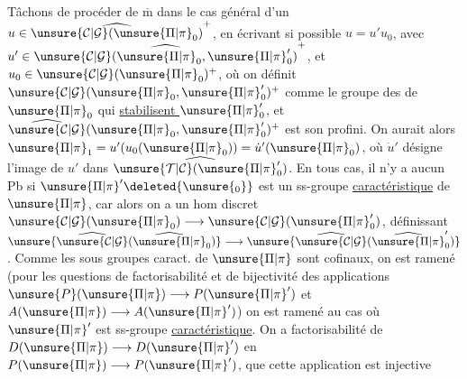 Tâchons de procéder de $\overline{\mathrm m}$ dans le cas général d'un $u\in\widehat{\unsure{\mathcal{C}|\mathcal{G}}(\unsure{\Pi|\pi}_0)}^+$,  en écrivant si possible $u=u'u_0$, avec $u'\in\widehat{\unsure{\mathcal{C}|\mathcal{G}}(\unsure{\Pi|\pi}_0,\unsure{\Pi|\pi}'_0)}^+$, et $u_0\in\unsure{\mathcal{C}|\mathcal{G}}(\unsure{\Pi|\pi}_0)^+$, où on définit $\unsure{\mathcal{C}|\mathcal{G}}(\unsure{\Pi|\pi}_0,\unsure{\Pi|\pi}'_0)^+$ comme le groupe des   de $\unsure{\Pi|\pi}_0$ qui \uline{stabilisent $\unsure{\Pi|\pi}'_0$}, et $\widehat{\unsure{\mathcal{C}|\mathcal{G}}}(\unsure{\Pi|\pi}_0,\unsure{\Pi|\pi}'_0)^+$ est son  profini. On aurait alors $\unsure{\Pi|\pi}_1=u'(u_0(\unsure{\Pi|\pi}_0))=\dot{u}'(\unsure{\Pi|\pi}_0)$, où  $\dot{u}'$ désigne l'image de $u'$ dans $\widehat{\unsure{\mathcal{T}|\mathcal{C}}(\unsure{\Pi|\pi}'_0)}$. En tous cas, il n'y a aucun Pb si $\unsure{\Pi|\pi}'\deleted{\unsure{_0}}$ est un ss-groupe  \uline{caractéristique} de $\unsure{\Pi|\pi}$, car alors on a un hom
discret $\unsure{\mathcal{C}|\mathcal{G}}(\unsure{\Pi|\pi}_0)\longrightarrow\unsure{\mathcal{C}|\mathcal{G}}(\unsure{\Pi|\pi}'_0)$, définissant  $\unsure{\widehat{\unsure{\mathcal{C}|\mathcal{G}}}(\widehat{\unsure{\Pi|\pi}}_0)}\longrightarrow\unsure{\widehat{\unsure{\mathcal{C}|\mathcal{G}}}(\widehat{\unsure{\Pi|\pi}}'_0)}$. Comme les sous groupes  caract. de $\unsure{\Pi|\pi}$ sont cofinaux, on est ramené (pour les questions de factorisabilité  et de bijectivité des applications $\unsure{P}(\unsure{\Pi|\pi})\longrightarrow P(\unsure{\Pi|\pi}')$ et $A(\unsure{\Pi|\pi})\longrightarrow A(\unsure{\Pi|\pi}')$) on est ramené au cas où $\unsure{\Pi|\pi}'$ est ss-groupe \uline{caractéristique}. On a    factorisabilité de $D(\unsure{\Pi|\pi})\longrightarrow D(\unsure{\Pi|\pi}')$ en $P(\unsure{\Pi|\pi})\longrightarrow P(\unsure{\Pi|\pi}')$,   que cette application est injective   
